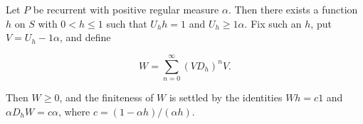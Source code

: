 Let $P$ be recurrent with positive regular measure $\alpha$. Then there exists a function $h$ on $S$ with $0 < h \leq 1$ such that $U_h h = 1$ and $U_h \geq 1\alpha$. Fix such an $h$, put $V = U_h - 1\alpha$, and define

$$W = \sum_{n=0}^{\infty} (V D_h)^n V.$$

Then $W \geq 0$, and the finiteness of $W$ is settled by the identities $W h = c 1$ and $\alpha D_h W = c \alpha$, where $c = (1 - \alpha h)/(\alpha h)$.
